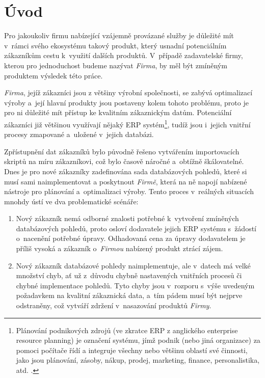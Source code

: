 \chapter{Úvod}\label{chap:intro}


Pro jakoukoliv firmu nabízející vzájemně provázané služby je důležité mít v~rámci svého ekosystému takový produkt, který usnadní potenciálním zákazníkům cestu k~využití dalších produktů.
V~případě zadavatelské firmy, kterou pro jednoduchost budeme nazývat \textit{Firma}, by měl být zmíněným produktem výsledek této práce.

\textit{Firma}, jejíž zákazníci jsou z většiny výrobní společnosti, se zabývá optimalizací výroby a~její hlavní produkty jsou postaveny kolem tohoto problému, proto je pro ni důležité mít přístup ke kvalitním zákaznickým datům.
Potenciální zákazníci již většinou využívají nějaký ERP systém\footnote{Plánování podnikových zdrojů (ve zkratce ERP z anglického enterprise resource planning) je označení systému, jímž podnik (nebo jiná organizace) za pomoci počítače řídí a integruje všechny nebo většinu oblastí své činnosti, jako jsou plánování, zásoby, nákup, prodej, marketing, finance, personalistika, atd. \cite{ERP}.},
tudíž jsou i~jejich vnitřní procesy zmapované a~uložené v~jejich databázi.

Zpřístupnění dat zákazníků bylo původně řešeno vytvářením importovacích skriptů na míru zákazníkovi, což bylo časově náročné a~obtížně škálovatelné.
Dnes je pro nové zákazníky zadefinována sada databázových pohledů, které si musí sami naimplementovat a poskytnout \textit{Firmě}, která na ně napojí nabízené nástroje pro plánování a~optimalizaci výroby.
Tento proces v~reálných situacích mnohdy ústí ve dva problematické scénáře:

\begin{enumerate}
    \item {
        Nový zákazník nemá odborné znalosti potřebné k~vytvoření zmíněných databázových pohledů, proto osloví dodavatele jejich ERP systému s~žádostí o~nacenění potřebné úpravy.
        Odhadovaná cena za úpravy dodavatelem je příliš vysoká a zákazník o~\textit{Firmou} nabízený produkt ztrácí zájem.
    }
    \item {
        Nový zákazník databázové pohledy naimplementuje, ale v~datech má velké množství chyb, ať už z~důvodu chybně nastavených vnitřních procesů či chybné implementace pohledů.
        Tyto chyby jsou v~rozporu s~výše uvedeným požadavkem na kvalitní zákaznická data, a~tím pádem musí být nejprve odstraněny, což vytváří zdržení v~nasazování produktů \textit{Firmy}.
    }
\end{enumerate}

